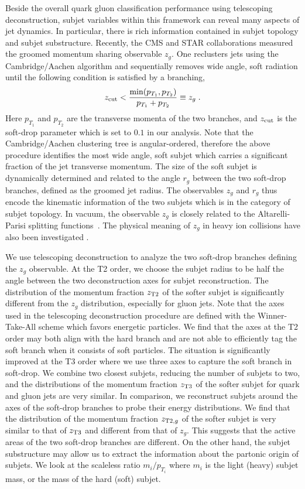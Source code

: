 \documentclass[notoc]{JHEP3}
\begin{document}
Beside the overall quark gluon classification performance using telescoping deconstruction, subjet variables within this framework can reveal many aspects of jet dynamics. In particular, there is rich information contained in subjet topology and subjet substructure. Recently, the CMS \cite{} and STAR \cite{} collaborations measured the groomed momentum sharing observable $z_g$. One reclusters jets using the Cambridge/Aachen algorithm \cite{Dokshitzer:1997in,Wobisch:1998wt} and sequentially removes wide angle, soft radiation until the following condition is satisfied by a branching,
\begin{equation}
    z_{\rm cut} < \frac{\min(p_{T_1},p_{T_2})}{p_{T_1}+p_{T_2}} \equiv z_g\;.
    \label{SD}
\end{equation}
Here $p_{T_1}$ and $p_{T_2}$ are the transverse momenta of the two branches, and $z_{\rm cut}$ is the soft-drop parameter which is set to $0.1$ in our analysis. Note that the Cambridge/Aachen clustering tree is angular-ordered, therefore the above procedure identifies the most wide angle, soft subjet which carries a significant fraction of the jet transverse momentum. The size of the soft subjet is dynamically determined and related to the angle $r_g$ between the two soft-drop branches, defined as the groomed jet radius. The observables $z_g$ and $r_g$ thus encode the kinematic information of the two subjets which is in the category of subjet topology. In vacuum, the observable $z_g$ is closely related to the Altarelli-Parisi splitting functions~\cite{Altarelli:1977zs}. The physical meaning of $z_g$ in heavy ion collisions have also been investigated \cite{Chien:2016led}. 

We use telescoping deconstruction to analyze the two soft-drop branches defining the $z_g$ observable. At the T2 order, we choose the subjet radius to be half the angle between the two deconstruction axes for subjet reconstruction. The distribution of the momentum fraction $z_{\rm T2}$ of the softer subjet is significantly different from the $z_g$ distribution, especially for gluon jets. Note that the axes used in the telescoping deconstruction procedure are defined with the Winner-Take-All scheme which favors energetic particles. We find that the axes at the T2 order may both align with the hard branch and are not able to efficiently tag the soft branch when it consists of soft particles. The situation is significantly improved at the T3 order where we use three axes to capture the soft branch in soft-drop. We combine two closest subjets, reducing the number of subjets to two, and the distributions of the momentum fraction $z_{\rm T3}$ of the softer subjet for quark and gluon jets are very similar. In comparison, we reconstruct subjets around the axes of the soft-drop branches to probe their energy distributions. We find that the distribution of the momentum fraction $z_{{\rm T2},g}$ of the softer subjet is very similar to that of $z_{\rm T3}$ and different from that of $z_g$. This suggests that the active areas of the two soft-drop branches are different. On the other hand, the subjet substructure may allow us to extract the information about the partonic origin of subjets. We look at the scaleless ratio $m_i/p_{T_i}$ where $m_i$ is the light (heavy) subjet mass, or the mass of the hard (soft) subjet.
\end{document}
